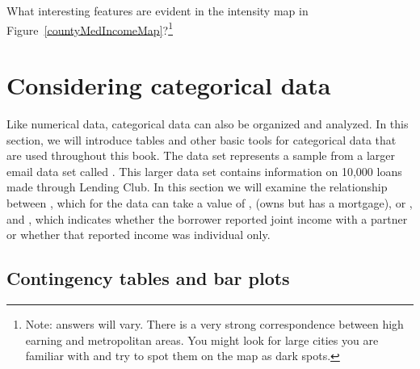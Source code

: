 \begin{exercise}
What interesting features are evident in the  intensity map in Figure~\ref{countyMedIncomeMap}?\footnote{Note: answers will vary. There is a very strong correspondence between high earning and metropolitan areas. You might look for large cities you are familiar with and try to spot them on the map as dark spots.}
\end{exercise}




\section[Considering categorical data]{Considering categorical data ~}
\label{categoricalData}


Like numerical data, categorical data can also be organized
and analyzed.
In this section, we will introduce tables and other basic tools
for categorical data that are used throughout this book.
The  data set represents a sample from a larger
email data set called .
This larger data set contains information on 10,000 loans made
through Lending Club.
In this section we will examine the relationship between
, which for the  data can take
a value of , 
(owns but has a mortgage), or ,
and ,
which indicates whether the borrower reported joint income
with a partner or whether that reported income was
individual only.


\subsection{Contingency tables and bar plots}

\newcommand{\loanapphomeAA}{3496}
\newcommand{\loanapphomeAB}{3839}
\newcommand{\loanapphomeAC}{1170}
\newcommand{\loanapphomeAD}{8505}
\newcommand{\loanapphomeBA}{362}
\newcommand{\loanapphomeBB}{950}
\newcommand{\loanapphomeBC}{183}
\newcommand{\loanapphomeBD}{1495}
\newcommand{\loanapphomeDA}{3858}
\newcommand{\loanapphomeDAPt}{0.3858} %
\newcommand{\loanapphomeDB}{4789}
\newcommand{\loanapphomeDC}{1353}
\newcommand{\loanapphomeDD}{10000}
\newcommand{\loanapphomeN}{\loanapphomeDD{}}

